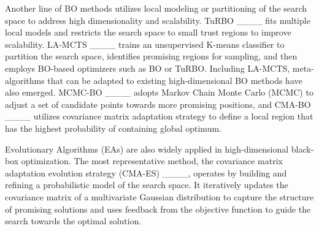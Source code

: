 Another line of BO methods utilizes local modeling or partitioning of the search space to address high dimensionality and scalability. TuRBO ____ fits multiple local models and restricts the search space to small trust regions to improve scalability. LA-MCTS ____ trains an unsupervised K-means classifier to partition the search space, identifies promising regions for sampling, and then employs BO-based optimizers such as BO or TuRBO. Including LA-MCTS, meta-algorithms that can be adapted to existing high-dimensional BO methods have also emerged. MCMC-BO ____ adopts Markov Chain Monte Carlo (MCMC) to adjust a set of candidate points towards more promising positions, and CMA-BO ____ utilizes covariance matrix adaptation strategy to define a local region that has the highest probability of containing global optimum.

Evolutionary Algorithms (EAs) are also widely applied in high-dimensional black-box optimization. The most representative method, the covariance matrix adaptation evolution strategy (CMA-ES) ____, operates by building and refining a probabilistic model of the search space. It iteratively updates the covariance matrix of a multivariate Gaussian distribution to capture the structure of promising solutions and uses feedback from the objective function to guide the search towards the optimal solution.



